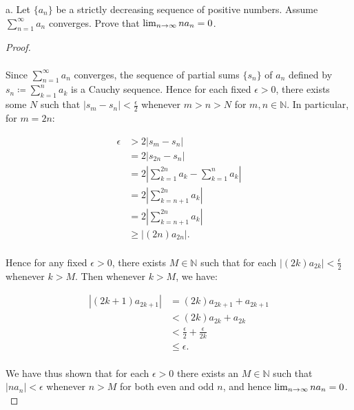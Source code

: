 a.  Let $\{a_n\}$ be a strictly decreasing sequence of positive numbers. Assume
    $\sum\limits_{n=1}^{\infty}{a_n}$ converges. Prove that
    ${\lim_{n \rightarrow \infty}{na_n}} = 0$.

    \begin{proof}\ \\\\
        Since $\sum\limits_{n=1}^{\infty}{a_n}$ converges, the sequence of
        partial sums $\{s_n\}$ of $a_n$ defined by
        $s_n \coloneqq \sum\limits_{k=1}^n{a_k}$ is a Cauchy sequence. Hence
        for each fixed $\epsilon > 0$, there exists some $N$ such that
        $|s_m - s_n| < \frac{\epsilon}{2}$ whenever
        $m > n > N$ for $m,n \in \mathbb{N}$.  In particular, for $m = 2n$:
    
        \begin{align*}
            \epsilon &> 2|s_m - s_n| \\
                     &= 2|s_{2n} - s_n| \\
                     &= 2\left|\sum\limits_{k=1}^{2n}{a_k} - \sum\limits_{k=1}^n{a_k}\right| \\
                     &= 2\left|\sum\limits_{k=n+1}^{2n}{a_k}\right| \\
                     &= 2\left|\sum\limits_{k=n+1}^{2n}{a_k}\right| \\
                     &\ge |(2n)a_{2n}|. \\
        \end{align*}

        Hence for any fixed $\epsilon > 0$, there exists $M \in \mathbb{N}$ such
        that for each $|(2k)a_{2k}| < \frac{\epsilon}{2}$ whenever $k > M$.
        Then whenever $k > M$, we have:

        \begin{align*}
            |(2k+1)a_{2k+1}| &= (2k)a_{2k+1} + a_{2k+1} \\
                             &< (2k)a_{2k} + a_{2k} \\
                             &< \frac{\epsilon}{2} + \frac{\epsilon}{2k} \\
                             &\le \epsilon. \\
        \end{align*}

        We have thus shown that for each $\epsilon > 0$ there exists an 
        $M \in \mathbb{N}$ such that $|na_n| < \epsilon$ whenever $n > M$ for
        both even and odd $n$, and hence ${\lim_{n \rightarrow \infty}{na_n}} = 0$.
        \\
    \end{proof}
    \pagebreak

